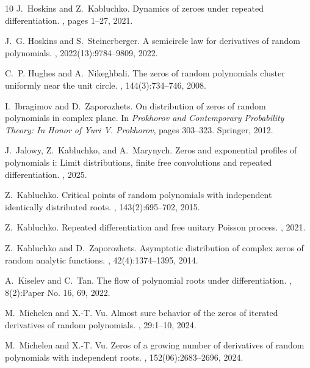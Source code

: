 \documentclass[11pt]{amsart}
\begin{document}
\begin{thebibliography}{10}
J.~Hoskins and Z.~Kabluchko.
\newblock Dynamics of zeroes under repeated differentiation.
, pages 1--27, 2021.

J.~G. Hoskins and S.~Steinerberger.
\newblock A semicircle law for derivatives of random polynomials.
, 2022(13):9784--9809, 2022.

C.~P. Hughes and A.~Nikeghbali.
\newblock The zeros of random polynomials cluster uniformly near the unit circle.
, 144(3):734--746, 2008.

I.~Ibragimov and D.~Zaporozhets.
\newblock On distribution of zeros of random polynomials in complex plane.
\newblock In {\em Prokhorov and Contemporary Probability Theory: In Honor of Yuri V. Prokhorov}, pages 303--323. Springer, 2012.

J.~Jalowy, Z.~Kabluchko, and A.~Marynych.
\newblock Zeros and exponential profiles of polynomials i: Limit distributions, finite free convolutions and repeated differentiation.
, 2025.

Z.~Kabluchko.
\newblock Critical points of random polynomials with independent identically distributed roots.
, 143(2):695--702, 2015.

Z.~Kabluchko.
\newblock Repeated differentiation and free unitary {P}oisson process.
, 2021.

Z.~Kabluchko and D.~Zaporozhets.
\newblock Asymptotic distribution of complex zeros of random analytic functions.
, 42(4):1374--1395, 2014.

A.~Kiselev and C.~Tan.
\newblock The flow of polynomial roots under differentiation.
, 8(2):Paper No. 16, 69, 2022.

M.~Michelen and X.-T. Vu.
\newblock Almost sure behavior of the zeros of iterated derivatives of random polynomials.
, 29:1--10, 2024.

M.~Michelen and X.-T. Vu.
\newblock Zeros of a growing number of derivatives of random polynomials with independent roots.
, 152(06):2683--2696, 2024.


\end{thebibliography}
\end{document}
